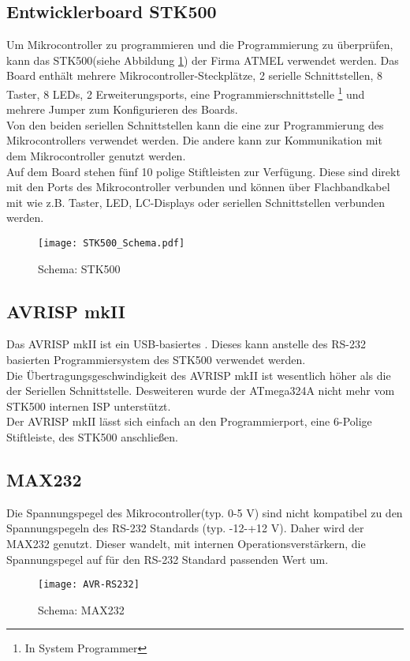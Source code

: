 \subsection{Entwicklerboard STK500}
Um Mikrocontroller zu programmieren und die Programmierung zu überprüfen, kann das  STK500(siehe Abbildung \ref{fig:STK500}) der Firma ATMEL verwendet werden. Das Board enthält mehrere Mikrocontroller-Steckplätze, 2 serielle Schnittstellen, 8 Taster, 8 LEDs, 2 Erweiterungsports, eine Programmierschnittstelle \footnote{In System Programmer} und mehrere Jumper zum Konfigurieren des Boards.\\
Von den beiden seriellen Schnittstellen kann die eine zur Programmierung des Mikrocontrollers verwendet werden. Die andere kann zur Kommunikation mit dem Mikrocontroller genutzt werden.\\
Auf dem Board stehen fünf 10 polige Stiftleisten 
zur Verfügung. Diese sind direkt mit den Ports des Mikrocontroller verbunden und können über Flachbandkabel mit  wie z.B. Taster, LED, LC-Displays oder seriellen Schnittstellen verbunden werden.
\begin{figure}[htb]
\centering
\texttt{[image: STK500\_Schema.pdf]}
\caption{Schema: STK500}
\label{fig:STK500}
\citep{atmel:ug_STK500}
\end{figure}

\subsection{AVRISP mkII}
Das AVRISP mkII ist ein USB-basiertes . Dieses kann anstelle des RS-232 basierten Programmiersystem des STK500 verwendet werden.\\
Die Übertragungsgeschwindigkeit des AVRISP mkII ist wesentlich höher als die der Seriellen Schnittstelle. Desweiteren wurde der ATmega324A nicht mehr vom STK500 internen ISP unterstützt.\\
Der AVRISP mkII lässt sich einfach an den Programmierport, eine 6-Polige Stiftleiste, des STK500 anschließen.

\subsection{MAX232}
Die Spannungspegel des Mikrocontroller(typ. 0-5 V) sind nicht kompatibel zu den Spannungspegeln des RS-232 Standards (typ. -12-+12 V). Daher wird der  MAX232 genutzt. Dieser wandelt, mit internen Operationsverstärkern, die Spannungspegel auf für den RS-232 Standard passenden Wert um.
\begin{figure}[htb]
\centering
\texttt{[image: AVR-RS232]}
\caption{Schema: MAX232}
\label{fig:MAX232}
\citep{uC:RS232}
\end{figure}

